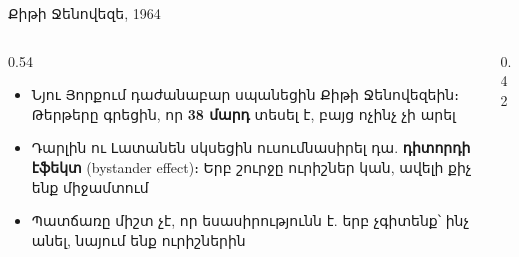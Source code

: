 \begin{frame}{Քիթի Ջենովեզե, 1964}
  \begin{columns}[T]
    \begin{column}{0.54\textwidth}
      \begin{itemize}
        \item Նյու Յորքում դաժանաբար սպանեցին Քիթի Ջենովեզեին։ Թերթերը գրեցին, որ \textbf{38 մարդ} տեսել է, բայց ոչինչ չի արել
        \item<2-> Դարլին ու Լատանեն սկսեցին ուսումնասիրել դա. \textbf{դիտորդի էֆեկտ} (bystander effect)։ Երբ շուրջը ուրիշներ կան, ավելի քիչ ենք միջամտում
        \item<3-> Պատճառը միշտ չէ, որ եսասիրությունն է. երբ չգիտենք՝ ինչ անել, նայում ենք ուրիշներին
      \end{itemize}
    \end{column}
    \begin{column}{0.42\textwidth}
    \end{column}
  \end{columns}
\end{frame}

